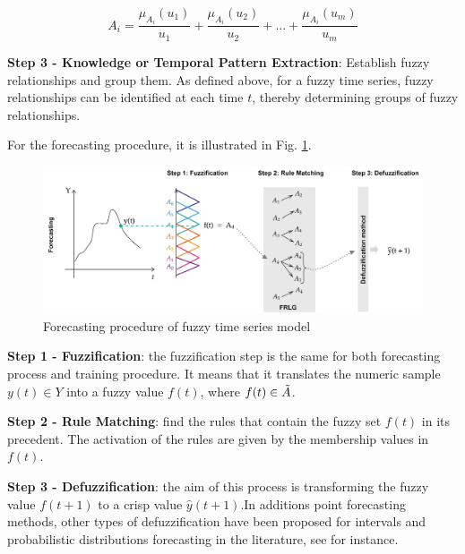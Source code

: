 \documentclass[conference]{IEEEtran}
\begin{document}
\begin{equation}\label{eq_fuzzy_step2}
    A_i = \frac{\mu_{A_i}(u_1)}{u_1} + \frac{\mu_{A_i}(u_2)}{u_2} + ... + \frac{\mu_{A_i}(u_m)}{u_m}
\end{equation}\par
\textbf{Step 3 - Knowledge or Temporal Pattern Extraction}: Establish fuzzy relationships and group them. As defined above, for a fuzzy time series, fuzzy relationships can be identified at each time \(t\), thereby determining groups of fuzzy relationships.\par
For the forecasting procedure, it is illustrated in Fig. \ref{fig_fuzzy_forecasting}.\par
\begin{figure}[H]
    \centering
    \begin{minipage}{0.45\textwidth}
    \centering
    \includegraphics[width=1\textwidth]{figures/method/Fuzzy_Forecasting.png}
    \caption{Forecasting procedure of fuzzy time series model}
    \label{fig_fuzzy_forecasting}
    \end{minipage}
\end{figure}\par
\textbf{Step 1 - Fuzziﬁcation}: the fuzziﬁcation step is the same for both forecasting process and training procedure. It means that it translates the numeric sample \(y(t) \in Y\) into a fuzzy value \(f(t)\), where \(f(t) \in \Tilde{A}\).\par
\textbf{Step 2 - Rule Matching}: ﬁnd the rules that contain the fuzzy set \(f(t)\) in its precedent. The activation of the rules are given by the membership values in \(f(t)\).\par
\textbf{Step 3 - Defuzziﬁcation}: the aim of this process is transforming the fuzzy value \(f(t+1)\) to a crisp value \(\hat{y}(t+1)\).In additions point forecasting methods, other types of defuzziﬁcation have been proposed for intervals and probabilistic distributions forecasting in the literature, see for instance.
\end{document}
